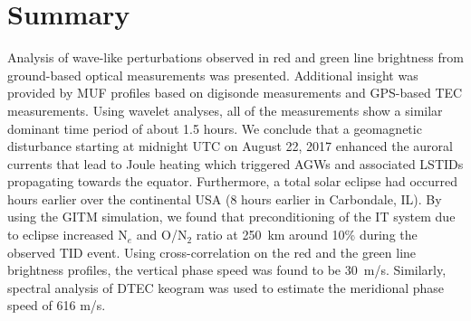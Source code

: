 \documentclass[crop=false,class=mitthesis,oneside,font=12pt]{standalone}
\begin{document}
% 
% 

\section{Summary}
Analysis of wave-like perturbations observed in red and green line brightness from ground-based optical measurements was presented. Additional insight was provided by MUF profiles based on digisonde measurements and GPS-based TEC measurements. Using wavelet analyses, all of the measurements show a similar dominant time period of about 1.5 hours. We conclude that a geomagnetic disturbance starting at midnight UTC on August 22, 2017 enhanced the auroral currents that lead to Joule heating which triggered AGWs and associated LSTIDs propagating towards the equator. Furthermore, a total solar eclipse had occurred hours earlier over the continental USA (8 hours earlier in Carbondale, IL). By using the GITM simulation, we found that preconditioning of the IT system due to eclipse increased N$_e$ and O/N$_2$ ratio at 250~km around 10\% during the observed TID event. Using cross-correlation on the red and the green line brightness profiles, the vertical phase speed was found to be 30~m/s. Similarly, spectral analysis of DTEC keogram was used to estimate the meridional phase speed of 616 m/s.
\end{document}

